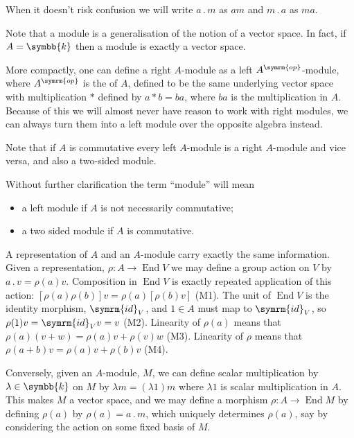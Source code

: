 \documentclass[fleqn]{NotesClass}
\renewcommand{\field}{\symbb{k}}
\newcommand{\id}{\symrm{id}}
\DeclareMathOperator{\End}{End}
\newcommand{\action}{\mathbin{.}}
\newcommand{\op}{\symrm{op}}
\begin{document}
    When it doesn't risk confusion we will write \(a \action m\) as \(am\) and \(m \action a\) as \(ma\).
    
    Note that a module is a generalisation of the notion of a vector space.
    In fact, if \(A = \field\) then a module is exactly a vector space.
    
    More compactly, one can define a right \(A\)-module as a left \(A^{\op}\)-module, where \(A^{\op}\) is the  of \(A\), defined to be the same underlying vector space with multiplication \(*\) defined by \(a * b = ba\), where \(ba\) is the multiplication in \(A\).
    Because of this we will almost never have reason to work with right modules, we can always turn them into a left module over the opposite algebra instead.
    
    Note that if \(A\) is commutative every left \(A\)-module is a right \(A\)-module and vice versa, and also a two-sided module.
    
    Without further clarification the term \enquote{module} will mean
    \begin{itemize}
        \item a left module if \(A\) is not necessarily commutative;
        \item a two sided module if \(A\) is commutative.
    \end{itemize}
    
    A representation of \(A\) and an \(A\)-module carry exactly the same information.
    Given a representation, \(\rho \colon A \to \End V\) we may define a group action on \(V\) by \(a \action v = \rho(a)v\).
    Composition in \(\End V\) is exactly repeated application of this action: \([\rho(a)\rho(b)]v = \rho(a)[\rho(b)v]\) (M1).
    The unit of \(\End V\) is the identity morphism, \(\id_V\), and \(1 \in A\) must map to \(\id_V\), so \(\rho(1)v = \id_V v = v\) (M2).
    Linearity of \(\rho(a)\) means that \(\rho(a)(v + w) = \rho(a)v + \rho(v)w\) (M3).
    Linearity of \(\rho\) means that \(\rho(a + b)v = \rho(a)v + \rho(b)v\) (M4).
    
    Conversely, given an \(A\)-module, \(M\), we can define scalar multiplication by \(\lambda \in \field\) on \(M\) by \(\lambda m = (\lambda 1) m\) where \(\lambda 1\) is scalar multiplication in \(A\).
    This makes \(M\) a vector space, and we may define a morphism \(\rho \colon A \to \End M\) by defining \(\rho(a)\) by \(\rho(a) = a \action m\), which uniquely determines \(\rho(a)\), say by considering the action on some fixed basis of \(M\).
    
\end{document}
